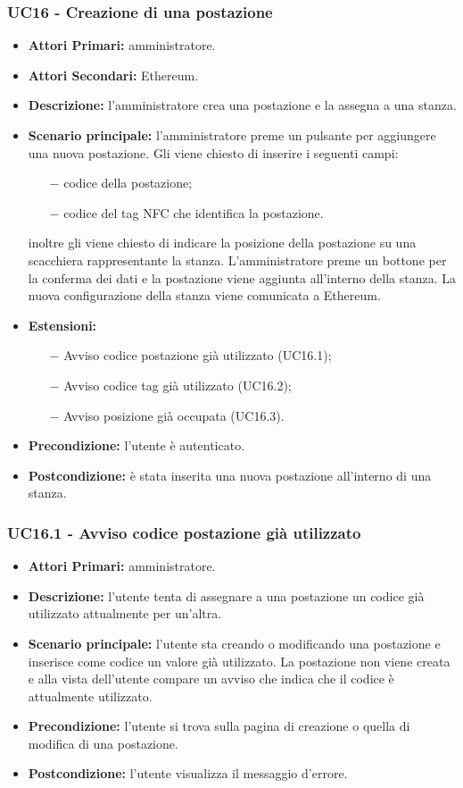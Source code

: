 \subsubsection{UC16 - Creazione di una postazione}
\begin{itemize}
	\item\textbf{Attori Primari:}
	amministratore.
	\item\textbf{Attori Secondari:}
	Ethereum.
	\item\textbf{Descrizione:}
	l'amministratore crea una postazione e la assegna a una stanza.
	\item\textbf{Scenario principale:} 
	l'amministratore preme un pulsante per aggiungere una nuova postazione. Gli viene chiesto di inserire i seguenti campi:
	\begin{itemize}
		\item[$-$] codice della postazione;
		\item[$-$] codice del tag NFC che identifica la postazione.
	\end{itemize}
	inoltre gli viene chiesto di indicare la posizione della postazione su una scacchiera rappresentante la stanza.
	L'amministratore preme un bottone per la conferma dei dati e la postazione viene aggiunta all'interno della stanza. La nuova configurazione della stanza viene comunicata a Ethereum.
	\item\textbf{Estensioni:}
	\begin{itemize}
		\item[$-$] Avviso codice postazione già utilizzato (UC16.1);
		\item[$-$] Avviso codice tag già utilizzato (UC16.2);
		\item[$-$] Avviso posizione già occupata (UC16.3).
	\end{itemize}
	\item\textbf{Precondizione:} 
	l'utente è autenticato.
	\item\textbf{Postcondizione:}
	è stata inserita una nuova postazione all'interno di una stanza.
\end{itemize}

\subsubsection{UC16.1 - Avviso codice postazione già utilizzato}
\begin{itemize}
	\item\textbf{Attori Primari:}
	amministratore.
	\item\textbf{Descrizione:}
	l'utente tenta di assegnare a una postazione un codice già utilizzato attualmente per un'altra.
	\item\textbf{Scenario principale:}
	l'utente sta creando o modificando una postazione e inserisce come codice un valore già utilizzato.
	La postazione non viene creata e alla vista dell'utente compare un avviso che indica che il codice è attualmente utilizzato.
	\item\textbf{Precondizione:}
	l'utente si trova sulla pagina di creazione o quella di modifica di una postazione.
	\item\textbf{Postcondizione:}
	l'utente visualizza il messaggio d'errore.
\end{itemize}

